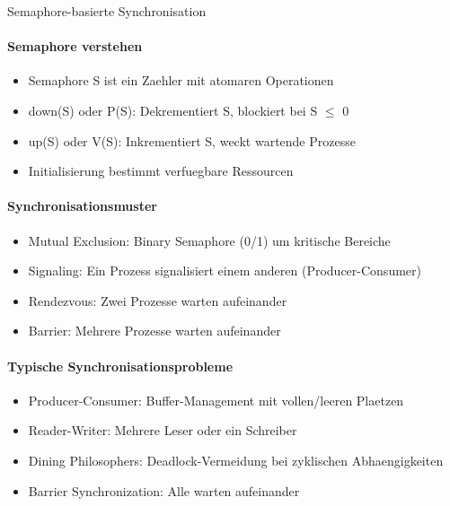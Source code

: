 \begin{KR}{Semaphore-basierte Synchronisation}
    \paragraph{Semaphore verstehen}
    \begin{itemize}
        \item Semaphore S ist ein Zaehler mit atomaren Operationen
        \item down(S) oder P(S): Dekrementiert S, blockiert bei S $\leq$  0
        \item up(S) oder V(S): Inkrementiert S, weckt wartende Prozesse
        \item Initialisierung bestimmt verfuegbare Ressourcen
    \end{itemize}
    
    \paragraph{Synchronisationsmuster}
    \begin{itemize}
        \item Mutual Exclusion: Binary Semaphore (0/1) um kritische Bereiche
        \item Signaling: Ein Prozess signalisiert einem anderen (Producer-Consumer)
        \item Rendezvous: Zwei Prozesse warten aufeinander
        \item Barrier: Mehrere Prozesse warten aufeinander
    \end{itemize}
    
    \paragraph{Typische Synchronisationsprobleme}
    \begin{itemize}
        \item Producer-Consumer: Buffer-Management mit vollen/leeren Plaetzen
        \item Reader-Writer: Mehrere Leser oder ein Schreiber
        \item Dining Philosophers: Deadlock-Vermeidung bei zyklischen Abhaengigkeiten
        \item Barrier Synchronization: Alle warten aufeinander
    \end{itemize}
    

\end{KR}
